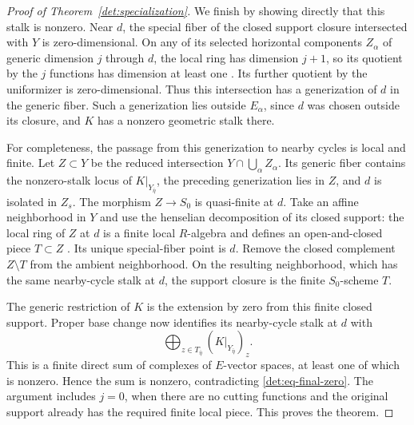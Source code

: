 \begin{proof}[Proof of Theorem~\ref{det:specialization}]
We finish by showing directly that this stalk is nonzero.  Near $d$,
the special fiber of the closed support closure intersected with $Y$
is zero-dimensional.  On any of its selected horizontal components
$Z_\alpha$ of generic dimension $j$ through $d$, the local ring has
dimension $j+1$, so its quotient by the $j$ functions has dimension
at least one \cite[Tag 0B52]{Stacks}.  Its further quotient by the uniformizer is
zero-dimensional.  Thus this intersection has a generization of $d$
in the generic fiber.  Such a generization lies outside $E_\alpha$,
since $d$ was chosen outside its closure, and $K$ has a nonzero
geometric stalk there.

For completeness, the passage from this generization to nearby cycles
is local and finite.  Let $Z\subset Y$ be the reduced intersection
$Y\cap\bigcup_\alpha Z_\alpha$.  Its generic fiber contains the
nonzero-stalk locus of $K|_{Y_{\bar\eta}}$, the preceding generization
lies in $Z$, and $d$ is isolated in $Z_s$.
The morphism $Z\to S_0$ is quasi-finite at $d$.
Take an affine neighborhood in $Y$ and use the henselian decomposition
of its closed support: the local ring of $Z$ at $d$ is a finite local
$R$-algebra and defines an open-and-closed piece $T\subset Z$
\cite[Tag 04GH(3) and its proof]{Stacks}.  Its unique special-fiber
point is $d$.  Remove the closed complement $Z\setminus T$ from the
ambient neighborhood.  On the resulting neighborhood, which has the
same nearby-cycle stalk at $d$, the support closure is the finite
$S_0$-scheme $T$.

The generic restriction of $K$ is the extension by zero from this
finite closed support.  Proper base change now identifies its
nearby-cycle stalk at $d$ with
\[
               \bigoplus_{z\in T_{\bar\eta}}
                             (K|_{Y_{\bar\eta}})_z.
\]
This is a finite direct sum of complexes of $E$-vector spaces, at
least one of which is nonzero.  Hence the sum is nonzero, contradicting
\eqref{det:eq-final-zero}.  The argument includes $j=0$, when
there are no cutting functions and the original support already has
the required finite local piece.  This proves the theorem.
\end{proof}

